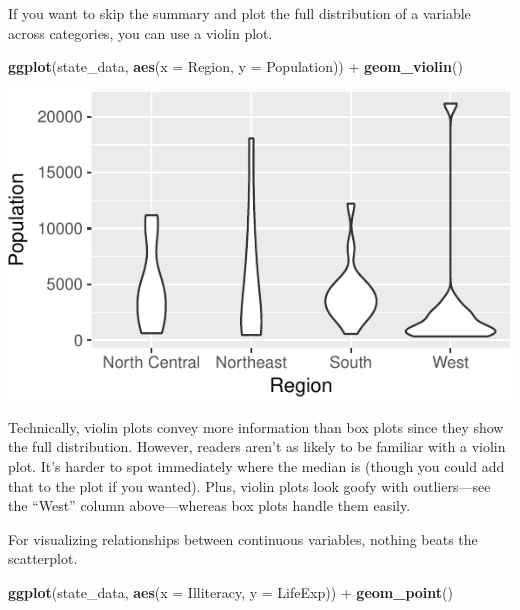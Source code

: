 \documentclass[12pt,oneside,openany]{book}
\newenvironment{Shaded}{\begin{snugshade}}{\end{snugshade}}
\newcommand{\KeywordTok}[1]{\textcolor[rgb]{0.13,0.29,0.53}{\textbf{{#1}}}}
\newcommand{\DataTypeTok}[1]{\textcolor[rgb]{0.13,0.29,0.53}{{#1}}}
\newcommand{\StringTok}[1]{\textcolor[rgb]{0.31,0.60,0.02}{{#1}}}
\newcommand{\NormalTok}[1]{{#1}}
\begin{document}
If you want to skip the summary and plot the full distribution of a
variable across categories, you can use a violin plot.

\begin{Shaded}
\begin{Highlighting}[]
\KeywordTok{ggplot}\NormalTok{(state_data, }\KeywordTok{aes}\NormalTok{(}\DataTypeTok{x =} \NormalTok{Region, }\DataTypeTok{y =} \NormalTok{Population)) +}
\StringTok{  }\KeywordTok{geom_violin}\NormalTok{()}
\end{Highlighting}
\end{Shaded}

\includegraphics{pdaps_files/figure-latex/violin-1.pdf}

Technically, violin plots convey more information than box plots since
they show the full distribution. However, readers aren't as likely to be
familiar with a violin plot. It's harder to spot immediately where the
median is (though you could add that to the plot if you wanted). Plus,
violin plots look goofy with outliers---see the ``West'' column
above---whereas box plots handle them easily.

For visualizing relationships between continuous variables, nothing
beats the scatterplot.

\begin{Shaded}
\begin{Highlighting}[]
\KeywordTok{ggplot}\NormalTok{(state_data, }\KeywordTok{aes}\NormalTok{(}\DataTypeTok{x =} \NormalTok{Illiteracy, }\DataTypeTok{y =} \NormalTok{LifeExp)) +}
\StringTok{  }\KeywordTok{geom_point}\NormalTok{()}
\end{Highlighting}
\end{Shaded}
\end{document}
